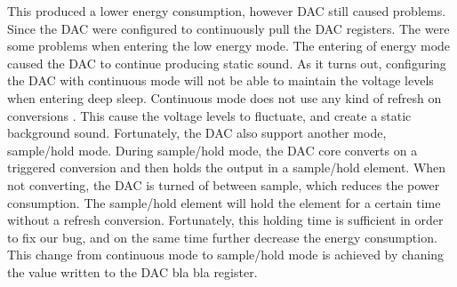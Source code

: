This produced a lower energy consumption, however DAC still caused problems. Since the DAC were configured to continuously pull the DAC registers. The were some problems when entering the low energy mode. The entering of energy mode caused the DAC to continue producing static sound. As it turns out, configuring the DAC with continuous mode will not be able to maintain the voltage levels when entering deep sleep. Continuous mode does not use any kind of refresh on conversions \cite{EFM32GG-rm}. This cause the voltage levels to fluctuate, and create a static background sound. Fortunately, the DAC also support another mode, sample/hold mode. During sample/hold mode, the DAC core converts on a triggered conversion and then holds the output in a sample/hold element. When not converting, the DAC is turned of between sample, which reduces the power consumption. The sample/hold element will hold the element for a certain time without a refresh conversion\cite{EFM32GG-rm}. Fortunately, this holding time is sufficient in order to fix our bug, and on the same time further decrease the energy consumption. This change from continuous mode to sample/hold mode is achieved by chaning the value written to the DAC bla bla register. 



   



  
       

 



